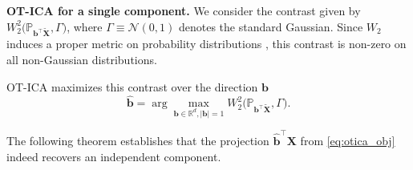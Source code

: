 \documentclass[accepted]{tpm2026} %
\newcommand{\Xb}{\mathbf{X}}
\begin{document}

\textbf{OT-ICA for a single component.}
We consider the contrast given by
$W_2^2\big(\mathbb{P}_{\mathbf{b}^\top \widetilde{\mathbf{X}}}, \Gamma\big)$, 
where $\Gamma \equiv \mathcal{N}(0,1)$ denotes the standard Gaussian.
Since  $W_2$ induces a proper metric on probability distributions \citep{villani2003}, this contrast  is non-zero on all non-Gaussian distributions.


OT-ICA maximizes this contrast over the direction $\mathbf{b}$
\begin{equation}
    \widehat{\mathbf{b}} = \arg\max_{\mathbf{b} \in \mathbb{R}^d, |\mathbf{b}|=1} W_2^2\big(\mathbb{P}_{\mathbf{b}^\top \widetilde{\mathbf{X}}}, \Gamma\big). \label{eq:otica_obj}
\end{equation}

The following theorem establishes that the projection $\widehat{\mathbf{b}}^\top \Xb$ from \eqref{eq:otica_obj} indeed recovers an independent component.
\end{document}
